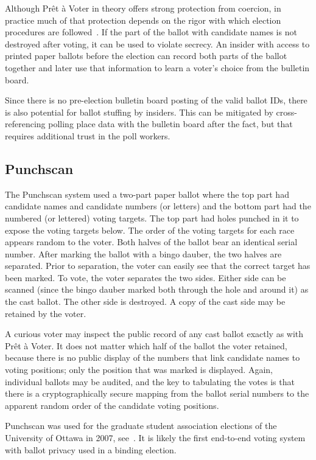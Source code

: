 Although Prêt à Voter in theory offers strong protection from
coercion, in practice much of that protection depends on the rigor
with which election procedures are followed~\cite{burton2012}. If the
part of the ballot with candidate names is not destroyed after voting,
it can be used to violate secrecy. An insider with access to printed
paper ballots before the election can record both parts of the ballot
together and later use that information to learn a voter's choice from
the bulletin board.

Since there is no pre-election bulletin board posting of the valid
ballot IDs, there is also potential for ballot stuffing by
insiders. This can be mitigated by cross-referencing polling place
data with the bulletin board after the fact, but that requires
additional trust in the poll workers.

\subsection{Punchscan~\cite{popoveniuc2006,popoveniuc2010punchscan}}

The Punchscan system used a two-part paper ballot where the top part
had candidate names and candidate numbers (or letters) and the bottom
part had the numbered (or lettered) voting targets.  The top part had
holes punched in it to expose the voting targets below.  The order of
the voting targets for each race appears random to the voter.  Both
halves of the ballot bear an identical serial number.  After marking
the ballot with a bingo dauber, the two halves are separated.  Prior
to separation, the voter can easily see that the correct target has
been marked.  To vote, the voter separates the two sides.  Either side
can be scanned (since the bingo dauber marked both through the hole
and around it) as the cast ballot. The other side is destroyed. A copy
of the cast side may be retained by the voter.

A curious voter may inspect the public record of any cast ballot
exactly as with Prêt à Voter. It does not matter which half of the
ballot the voter retained, because there is no public display of the
numbers that link candidate names to voting positions; only the
position that was marked is displayed.  Again, individual ballots may
be audited, and the key to tabulating the votes is that there is a
cryptographically secure mapping from the ballot serial numbers to the
apparent random order of the candidate voting positions.

Punchscan was used for the graduate student association elections of
the University of Ottawa in 2007, see~\cite{essex2007}. It is likely
the first end-to-end voting system with ballot privacy used in a
binding election.

